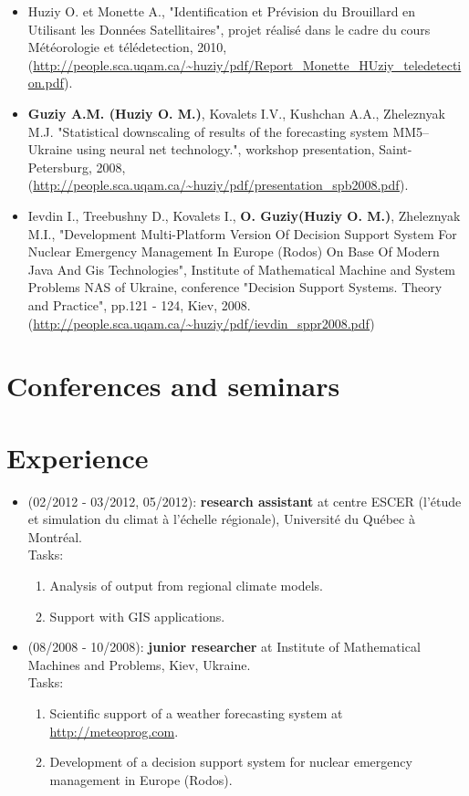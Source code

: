 \documentclass[12pt,a4paper,sans]{moderncv}
\begin{document}
\begin{itemize}
    \item Huziy O. et Monette A., "Identification et Prévision du
    Brouillard en Utilisant les Données Satellitaires", projet réalisé dans le cadre du cours Météorologie et télédetection,
       2010, (\url{http://people.sca.uqam.ca/~huziy/pdf/Report_Monette_HUziy_teledetection.pdf}).

    \item \textbf{Guziy A.M. (Huziy O. M.)}, Kovalets I.V., Kushchan A.A.,
    Zheleznyak M.J.
    "Statistical downscaling of results of the forecasting system MM5–Ukraine using neural net technology.",
    workshop presentation, Saint-Petersburg, 2008, (\url{http://people.sca.uqam.ca/~huziy/pdf/presentation_spb2008.pdf}).

    \item Ievdin I., Treebushny D., Kovalets I., \textbf{O. Guziy(Huziy O.
    M.)}, Zheleznyak M.I., "Development Multi-Platform Version Of Decision
    Support System For Nuclear Emergency Management In Europe (Rodos) On Base Of Modern Java And Gis Technologies",
    Institute of Mathematical Machine and System Problems NAS of Ukraine, conference
    "Decision Support Systems. Theory and Practice", pp.121 - 124, Kiev, 2008.
     (\url{http://people.sca.uqam.ca/~huziy/pdf/ievdin_sppr2008.pdf})

\end{itemize}

\section*{Conferences and seminars}



\section*{Experience}
\begin{itemize}

  \item (02/2012 - 03/2012, 05/2012):
  \textbf{research assistant} at centre ESCER (l'étude et simulation du climat à
  l'échelle régionale), Université du Québec à Montréal.\\
  Tasks:
  \begin{enumerate}
    \item Analysis of output from regional climate models.
    \item Support with GIS applications.
  \end{enumerate}

  \item (08/2008 - 10/2008):
   \textbf{junior researcher} at Institute of Mathematical
  Machines and Problems, Kiev, Ukraine. \\
  Tasks:
  \begin{enumerate}
    \item Scientific support of a weather forecasting system at
    \href{http://meteoprog.com}{http://meteoprog.com}.
    \item Development of a decision support system for nuclear emergency
    management in Europe (Rodos).
  \end{enumerate}
\end{itemize}
\end{document}
